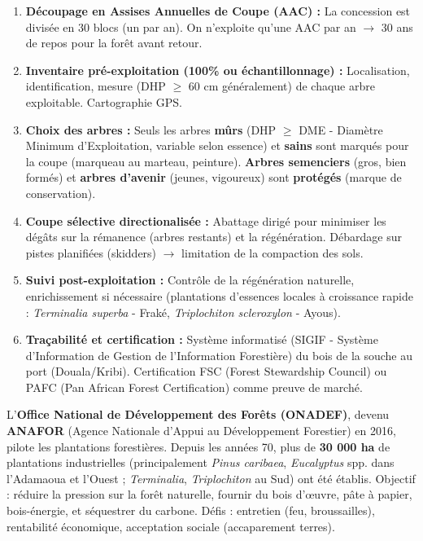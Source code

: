 \documentclass[11pt]{article}
\newcommand{\cle}[1]{{\popxbold\color{popdark}#1}}
\begin{document}
\begin{propriete}
\begin{enumerate}
    \item \textbf{Découpage en Assises Annuelles de Coupe (AAC) :} La concession est divisée en 30 blocs (un par an). On n'exploite qu'une AAC par an $\rightarrow$ 30 ans de repos pour la forêt avant retour.
    \item \textbf{Inventaire pré-exploitation (100\% ou échantillonnage) :} Localisation, identification, mesure (\cle{DHP} $\ge$ 60 cm généralement) de chaque arbre exploitable. Cartographie GPS.
    \item \textbf{Choix des arbres :} Seuls les arbres \textbf{mûrs} (\cle{DHP} $\ge$ \cle{DME} - Diamètre Minimum d'Exploitation, variable selon essence) et \textbf{sains} sont marqués pour la coupe (marqueau au marteau, peinture). \textbf{Arbres semenciers} (gros, bien formés) et \textbf{arbres d'avenir} (jeunes, vigoureux) sont \textbf{protégés} (marque de conservation).
    \item \textbf{Coupe sélective directionalisée :} Abattage dirigé pour minimiser les dégâts sur la rémanence (arbres restants) et la régénération. Débardage sur pistes planifiées (skidders) $\rightarrow$ limitation de la compaction des sols.
    \item \textbf{Suivi post-exploitation :} Contrôle de la régénération naturelle, enrichissement si nécessaire (plantations d'essences locales à croissance rapide : \emph{Terminalia superba} - Fraké, \emph{Triplochiton scleroxylon} - Ayous).
    \item \textbf{Traçabilité et certification :} Système informatisé (SIGIF - Système d'Information de Gestion de l'Information Forestière) du bois de la souche au port (Douala/Kribi). Certification FSC (Forest Stewardship Council) ou PAFC (Pan African Forest Certification) comme preuve de marché.
\end{enumerate}
\end{propriete}

\begin{savaistu}
L'\textbf{Office National de Développement des Forêts (ONADEF)}, devenu \textbf{ANAFOR} (Agence Nationale d'Appui au Développement Forestier) en 2016, pilote les plantations forestières. Depuis les années 70, plus de \textbf{30 000 ha} de plantations industrielles (principalement \emph{Pinus caribaea}, \emph{Eucalyptus} spp. dans l'Adamaoua et l'Ouest ; \emph{Terminalia}, \emph{Triplochiton} au Sud) ont été établis. Objectif : réduire la pression sur la forêt naturelle, fournir du bois d'œuvre, pâte à papier, bois-énergie, et séquestrer du carbone. Défis : entretien (feu, broussailles), rentabilité économique, acceptation sociale (accaparement terres).
\end{savaistu}
\end{document}
